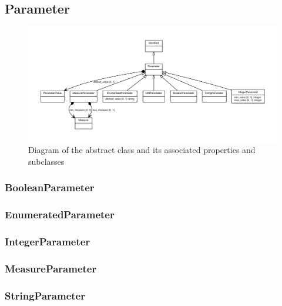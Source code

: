 \subsection{Parameter}
\label{sec:Parameter}

\begin{figure}[ht]
\begin{center}
\includegraphics[scale=0.8]{figures/Parameter_definition_and_abstraction}
\caption[]{Diagram of the  abstract class and its associated properties and subclasses}
\label{uml:Parameter}
\end{center}
\end{figure}

\subsubsection{BooleanParameter}
\label{sec:BooleanParameter}

\subsubsection{EnumeratedParameter}
\label{sec:EnumeratedParameter}

\subsubsection{IntegerParameter}
\label{sec:IntegerParameter}

\subsubsection{MeasureParameter}
\label{sec:MeasureParameter}

\subsubsection{StringParameter}
\label{sec:StringParameter}

